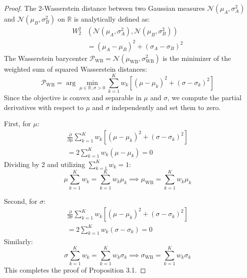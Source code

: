 \documentclass{article}
\theoremstyle{plain}
\theoremstyle{definition}
\theoremstyle{remark}
\begin{document}
\begin{proof}
The 2-Wasserstein distance between two Gaussian measures $\mathcal{N}(\mu_A, \sigma_A^2)$ and $\mathcal{N}(\mu_B, \sigma_B^2)$ on $\mathbb{R}$ is analytically defined as:
\begin{equation}
\begin{split}
  W_2^2&\left(\mathcal{N}(\mu_A, \sigma_A^2), \mathcal{N}(\mu_B, \sigma_B^2)\right) \\
  &= (\mu_A - \mu_B)^2 + (\sigma_A - \sigma_B)^2
\end{split}
\end{equation}
The Wasserstein barycenter $\mathcal{P}_{\text{WB}} = \mathcal{N}(\mu_{\text{WB}}, \sigma_{\text{WB}}^2)$ is the minimizer of the weighted sum of squared Wasserstein distances:
\begin{equation}
  \mathcal{P}_{\text{WB}} = \arg\min_{\mu \in \mathbb{R}, \sigma > 0} \sum_{k=1}^K w_k \left[ (\mu - \mu_k)^2 + (\sigma - \sigma_k)^2 \right]
\end{equation}
Since the objective is convex and separable in $\mu$ and $\sigma$, we compute the partial derivatives with respect to $\mu$ and $\sigma$ independently and set them to zero.

First, for $\mu$:
\begin{equation}
\begin{split}
  \frac{\partial}{\partial \mu} \sum_{k=1}^K w_k \left[ (\mu - \mu_k)^2 + (\sigma - \sigma_k)^2 \right] \\
  = 2 \sum_{k=1}^K w_k (\mu - \mu_k) = 0
\end{split}
\end{equation}
Dividing by 2 and utilizing $\sum_{k=1}^K w_k = 1$:
\begin{equation}
  \mu \sum_{k=1}^K w_k = \sum_{k=1}^K w_k \mu_k \implies \mu_{\text{WB}} = \sum_{k=1}^K w_k \mu_k
\end{equation}

Second, for $\sigma$:
\begin{equation}
\begin{split}
  \frac{\partial}{\partial \sigma} \sum_{k=1}^K w_k \left[ (\mu - \mu_k)^2 + (\sigma - \sigma_k)^2 \right] \\
  = 2 \sum_{k=1}^K w_k (\sigma - \sigma_k) = 0
\end{split}
\end{equation}
Similarly:
\begin{equation}
  \sigma \sum_{k=1}^K w_k = \sum_{k=1}^K w_k \sigma_k \implies \sigma_{\text{WB}} = \sum_{k=1}^K w_k \sigma_k
\end{equation}
This completes the proof of Proposition 3.1.
\end{proof}
\end{document}
